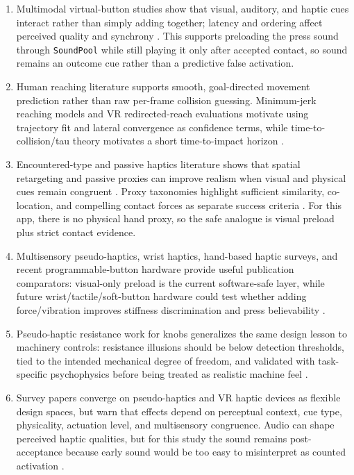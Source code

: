 \documentclass[11pt]{article}
\begin{document}
\begin{enumerate}
  \item Multimodal virtual-button studies show that visual, auditory, and haptic cues interact rather than simply adding together; latency and ordering affect perceived quality and synchrony \cite{faeth2012modality,faeth2014emergent,kaaresoja2014temporallyperfect,brahimaj2023audiotactilebutton}. This supports preloading the press sound through \texttt{SoundPool} while still playing it only after accepted contact, so sound remains an outcome cue rather than a predictive false activation.
  \item Human reaching literature supports smooth, goal-directed movement prediction rather than raw per-frame collision guessing. Minimum-jerk reaching models and VR redirected-reach evaluations motivate using trajectory fit and lateral convergence as confidence terms, while time-to-collision/tau theory motivates a short time-to-impact horizon \cite{flash1985minimumjerk,lee1976tau,gonzalez2019minjerk}.
  \item Encountered-type and passive haptics literature shows that spatial retargeting and passive proxies can improve realism when visual and physical cues remain congruent \cite{gonzalez2020reachplus,cheng2017sparseproxy}. Proxy taxonomies highlight sufficient similarity, co-location, and compelling contact forces as separate success criteria \cite{nilsson2021hapticproxies}. For this app, there is no physical hand proxy, so the safe analogue is visual preload plus strict contact evidence.
  \item Multisensory pseudo-haptics, wrist haptics, hand-based haptic surveys, and recent programmable-button hardware provide useful publication comparators: visual-only preload is the current software-safe layer, while future wrist/tactile/soft-button hardware could test whether adding force/vibration improves stiffness discrimination and press believability \cite{pezent2022tasbi,pezent2023multisensory,tong2023handhaptics,raegrant2024dynabuttons,youn2025hapticoil}.
  \item Pseudo-haptic resistance work for knobs generalizes the same design lesson to machinery controls: resistance illusions should be below detection thresholds, tied to the intended mechanical degree of freedom, and validated with task-specific psychophysics before being treated as realistic machine feel \cite{feick2023turnitup}.
  \item Survey papers converge on pseudo-haptics and VR haptic devices as flexible design spaces, but warn that effects depend on perceptual context, cue type, physicality, actuation level, and multisensory congruence. Audio can shape perceived haptic qualities, but for this study the sound remains post-acceptance because early sound would be too easy to misinterpret as counted activation \cite{bouzbib2021canitouch,ujitoko2021survey,xavier2024survey,abdo2024audio}.

\end{enumerate}
\end{document}
